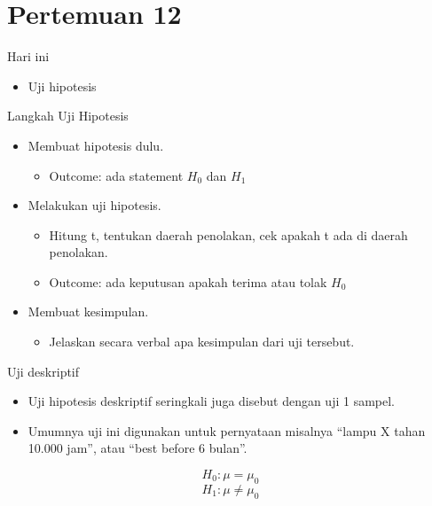 \documentclass[
  ignorenonframetext,
]{beamer}
\providecommand{\tightlist}{%
  \setlength{\itemsep}{0pt}\setlength{\parskip}{0pt}}\usepackage{longtable,booktabs,array}
\begin{document}
\section{Pertemuan 12}\label{pertemuan-12}

\begin{frame}{Hari ini}
\label{hari-ini-2}
\begin{itemize}
\tightlist
\item
  Uji hipotesis
\end{itemize}
\end{frame}

\begin{frame}{Langkah Uji Hipotesis}
\label{langkah-uji-hipotesis}
\begin{itemize}
\item
  Membuat hipotesis dulu.

  \begin{itemize}
  \tightlist
  \item
    Outcome: ada statement \(H_0\) dan \(H_1\)
  \end{itemize}
\item
  Melakukan uji hipotesis.

  \begin{itemize}
  \item
    Hitung t, tentukan daerah penolakan, cek apakah t ada di daerah
    penolakan.
  \item
    Outcome: ada keputusan apakah terima atau tolak \(H_0\)
  \end{itemize}
\item
  Membuat kesimpulan.

  \begin{itemize}
  \tightlist
  \item
    Jelaskan secara verbal apa kesimpulan dari uji tersebut.
  \end{itemize}
\end{itemize}
\end{frame}

\begin{frame}{Uji deskriptif}
\label{uji-deskriptif}
\begin{itemize}
\item
  Uji hipotesis deskriptif seringkali juga disebut dengan uji 1 sampel.
\item
  Umumnya uji ini digunakan untuk pernyataan misalnya ``lampu X tahan
  10.000 jam'', atau ``best before 6 bulan''.
\end{itemize}

\[
H_0: \mu = \mu_0
\] \[
H_1: \mu \neq \mu_0
\]
\end{frame}
\end{document}
